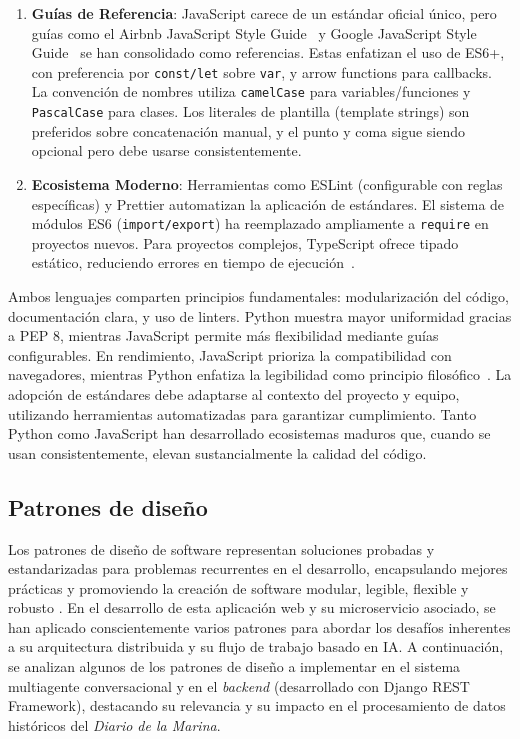 \begin{enumerate}
	\item \textbf{Guías de Referencia}: JavaScript carece de un estándar oficial único, pero guías como el Airbnb JavaScript Style Guide~\cite{AirbnbJS} y Google JavaScript Style Guide~\cite{GoogleJS} se han consolidado como referencias. Estas enfatizan el uso de ES6+, con preferencia por \texttt{const/let} sobre \texttt{var}, y arrow functions para callbacks.\\
	La convención de nombres utiliza \texttt{camelCase} para variables/funciones y \texttt{PascalCase} para clases. Los literales de plantilla (template strings) son preferidos sobre concatenación manual, y el punto y coma sigue siendo opcional pero debe usarse consistentemente.
	\item \textbf{Ecosistema Moderno}: Herramientas como ESLint (configurable con reglas específicas) y Prettier automatizan la aplicación de estándares. El sistema de módulos ES6 (\texttt{import/export}) ha reemplazado ampliamente a \texttt{require} en proyectos nuevos. Para proyectos complejos, TypeScript ofrece tipado estático, reduciendo errores en tiempo de ejecución~\cite{TypeScript}.
\end{enumerate}

Ambos lenguajes comparten principios fundamentales: modularización del código, documentación clara, y uso de linters. Python muestra mayor uniformidad gracias a PEP 8, mientras JavaScript permite más flexibilidad mediante guías configurables. En rendimiento, JavaScript prioriza la compatibilidad con navegadores, mientras Python enfatiza la legibilidad como principio filosófico~\cite{PEP20}. La adopción de estándares debe adaptarse al contexto del proyecto y equipo, utilizando herramientas automatizadas para garantizar cumplimiento. Tanto Python como JavaScript han desarrollado ecosistemas maduros que, cuando se usan consistentemente, elevan sustancialmente la calidad del código.

\subsection{Patrones de diseño}
\label{sec:patrones_diseno}

Los patrones de diseño de software representan soluciones probadas y estandarizadas para problemas recurrentes en el desarrollo, encapsulando mejores prácticas y promoviendo la creación de software modular, legible, flexible y robusto \cite{gavilanez2022analisis}. En el desarrollo de esta aplicación web y su microservicio asociado, se han aplicado conscientemente varios patrones para abordar los desafíos inherentes a su arquitectura distribuida y su flujo de trabajo basado en IA. A continuación, se analizan algunos de los patrones de diseño a implementar en el sistema multiagente conversacional y en el \textit{backend} (desarrollado con Django REST Framework), destacando su relevancia y su impacto en el procesamiento de datos históricos del \textit{Diario de la Marina}.

